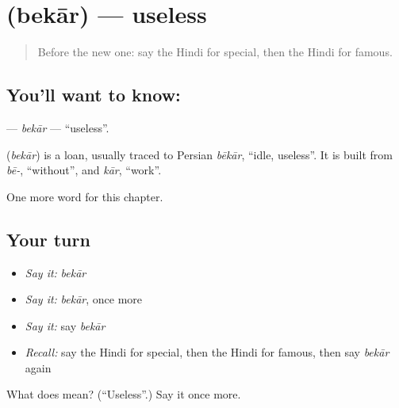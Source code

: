 \section[\texorpdfstring{\hi{बेकार} (bekār)}{बेकार (bekār)}]{ (bekār) — useless}

\label{lesson:HI-C242-bekar}



\begin{quote}
Before the new one: say the Hindi for special, then the Hindi for famous.
\end{quote}

\subsection*{You'll want to know: }
\textbf{} — \emph{bekār} — \textquotedblleft{}useless\textquotedblright{}.

\begin{cousinweb}
\textbf{} (\emph{bekār}) is a loan, usually traced to Persian \emph{bēkār}, \textquotedblleft{}idle, useless\textquotedblright{}. It is built from \emph{bē-}, \textquotedblleft{}without\textquotedblright{}, and \emph{kār}, \textquotedblleft{}work\textquotedblright{}.
\end{cousinweb}

\begin{grammarlens}[title={What you've built}]
One more word for this chapter.
\end{grammarlens}

\subsection*{Your turn}
\begin{itemize}
\raggedright
  \item \emph{Say it:} \emph{bekār}
  \item \emph{Say it:} \emph{bekār}, once more
  \item \emph{Say it:} say \emph{bekār}
  \item \emph{Recall:} say the Hindi for special, then the Hindi for famous, then say \emph{bekār} again
\end{itemize}

\begin{tcolorbox}[breakable,colback=teal!4,colframe=teal!35!black,title={Before you move on}]
What does  mean? (\textquotedblleft{}Useless\textquotedblright{}.) Say it once more.
\end{tcolorbox}
